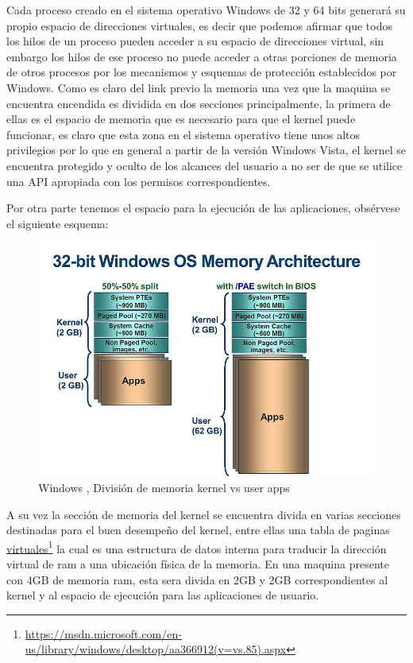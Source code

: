 \documentclass[paper=a4, fontsize=12pt]{article} 		%
\newcommand\fnurl[2]{%
\href{#2}{#1}\footnote{\url{#2}}%
}
\numberwithin{equation}{section}						%
\numberwithin{table}{section} 							%
\begin{document}
Cada proceso creado en el sistema operativo Windows de 32 y 64 bits generará su propio espacio de direcciones virtuales, es decir que podemos afirmar que todos los hilos de un proceso pueden acceder a su espacio de direcciones virtual, sin embargo los hilos de ese proceso no puede acceder a otras porciones de memoria de otros procesos por los mecanismos y esquemas de protección establecidos por Windows. Como es claro del link previo la memoria una vez que la maquina se encuentra encendida es dividida en dos secciones principalmente, la primera de ellas es el espacio de memoria que es necesario para que el kernel puede funcionar, es claro que esta zona en el sistema operativo tiene unos altos privilegios por lo que en general a partir de la versión Windows Vista, el kernel se encuentra protegido y oculto de los alcances del usuario a no ser de que se utilice una API apropiada con los permisos correspondientes. 

Por otra parte tenemos el espacio para la ejecución de las aplicaciones, obsérvese el siguiente esquema:
\begin{figure}[H]
 \centering
\includegraphics[scale=0.55]{img/winmemory.jpg}
\caption{Windows , División de memoria kernel vs user apps}
\label{fig:dis3}
\end{figure}
A su vez la sección de memoria del kernel se encuentra divida en varias secciones destinadas para el buen desempeño del kernel, entre ellas una tabla de paginas \fnurl{virtuales}{https://msdn.microsoft.com/en-us/library/windows/desktop/aa366912(v=vs.85).aspx} la cual es una estructura de datos interna para traducir la dirección virtual de ram a una ubicación física de la memoria. En una maquina presente con 4GB de memoria ram, esta sera divida en 2GB y 2GB correspondientes al kernel y al espacio de ejecución para las aplicaciones de usuario. 
\end{document}
